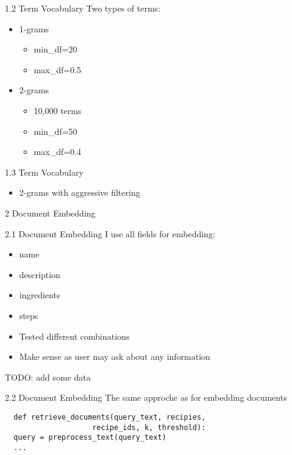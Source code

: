\documentclass{beamer}
\begin{document}
\begin{frame}{1.2 Term Vocabulary}
  Two types of terms:
  \begin{itemize}
    \item 1-grams
      \begin{itemize}
        \item min\_df=20
        \item max\_df=0.5
      \end{itemize}
    \item 2-grams
      \begin{itemize}
        \item 10,000 terms
        \item min\_df=50
        \item max\_df=0.4
      \end{itemize}
  \end{itemize}

\end{frame}

\begin{frame}{1.3 Term Vocabulary}
  \begin{itemize}
    \item 2-grams with aggressive filtering
  \end{itemize}
\end{frame}

\begin{frame}{2 Document Embedding}
\end{frame}

\begin{frame}{2.1 Document Embedding}
  I use all fields for embedding:
  \begin{itemize}
    \item name
    \item description
    \item ingredients
    \item steps
  \end{itemize}

  \begin{itemize}
    \item Tested different combinations
    \item Make sense as user may ask about any information
  \end{itemize}
  TODO: add some data
\end{frame}

\begin{frame}[fragile]{2.2 Document Embedding}
  The same approche as for embedding documents
    \begin{verbatim}
  def retrieve_documents(query_text, recipies,
                    recipe_ids, k, threshold):
  query = preprocess_text(query_text)
  ...
    \end{verbatim}
\end{frame}
\end{document}
